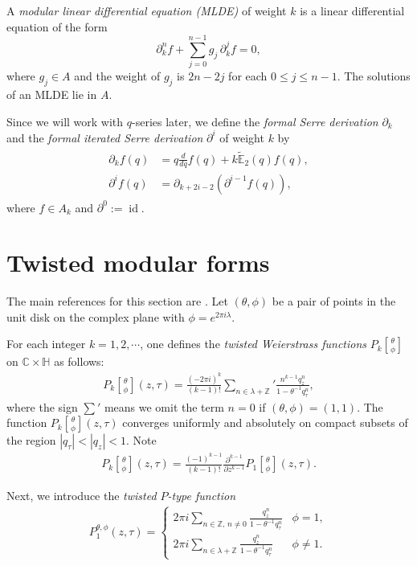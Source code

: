 \documentclass[9pt]{amsart}
\begin{document}
A {\em modular linear differential equation (MLDE)} of weight $k$ is a linear differential equation of the form
\[
\partial_k^n f + \sum_{j=0}^{n-1} g_j \, \partial_k^j f = 0,
\]
where $g_j \in A$ and the weight of $g_j$ is $2n - 2j$ for each $0 \leq j \leq n-1$. The solutions of an MLDE lie in $A$.

Since we will work with $q$-series later, we define the {\em formal Serre derivation} $\partial_k$ and the {\em formal iterated Serre derivation} $\partial^i$ of weight $k$ by
\begin{align}\label{serrederi}
\begin{split}
\partial_k f(q) &= q \frac{d}{dq} f(q) + k \tilde{\mathbb{E}}_2(q) f(q), \\
\partial^i f(q) &= \partial_{k+2i-2} \left( \partial^{i-1} f(q) \right),
\end{split}
\end{align}
where $f \in A_k$ and $\partial^0 := \operatorname{id}$.




\section{Twisted modular forms}
The main references for this section are \cite{dong2000modular, mason2008torus}. Let $(\theta,\phi)$ be a pair of points in the unit disk on the complex plane with $\phi=e^{2\pi i\lambda}$.

For each integer $k=1,2,\cdots$, one defines the {\em twisted Weierstrass functions} $P_{k}\genfrac[]{0pt}{0}{\theta}{\phi}$ on $\mathbb{C}\times \mathbb{H}$ as follows:
\begin{align}\label{pqfunction1}
  P_{k}\genfrac[]{0pt}{0}{\theta}{\phi}(z,\tau)=\frac{(-2\pi i)^{k}}{(k-1)!}\sum_{n\in \lambda+\mathbb{Z}}'\frac{n^{k-1}q_{z}^{n}}{1-\theta^{-1} q_{\tau}^{n}},
\end{align}
where the sign $\sum'$ means we omit the term $n=0$ if $(\theta,\phi)=(1,1)$. The function $P_{k}\genfrac[]{0pt}{0}{\theta}{\phi}(z,\tau)$ converges uniformly and absolutely on compact subsets of the region $|q_{\tau}|<|q_{z}|<1$. Note
\begin{align}\label{pqfunction6}
    P_{k}\genfrac[]{0pt}{0}{\theta}{\phi}(z,\tau)=\frac{(-1)^{k-1}}{(k-1)!}\frac{\partial^{k-1}}{\partial z^{k-1}}P_{1}\genfrac[]{0pt}{0}{\theta}{\phi}(z,\tau).
\end{align}

Next, we introduce the {\em twisted $P$-type function}
\begin{align}\label{pqfunction3}
  P_{1}^{\theta,\phi}(z,\tau)=\begin{cases}
               2\pi i \sum_{n\in \mathbb{Z},\, n\neq 0}\frac{q_{z}^{n}}{1-\theta^{-1} q_{\tau}^{n}}   & \phi=1,\\
               2\pi i \sum_{n\in \lambda+\mathbb{Z}}\frac{q_{z}^{n}}{1-\theta^{-1} q_{\tau}^{n}}      & \phi\neq 1.
            \end{cases}
\end{align}
\end{document}
